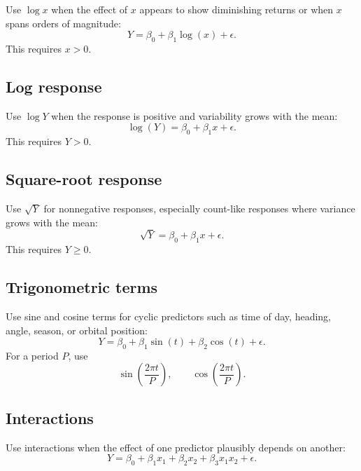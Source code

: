 Use \(\log x\) when the effect of \(x\) appears to show diminishing returns or when \(x\) spans orders of magnitude:
\begin{equation}
  Y=\beta_0+\beta_1\log(x)+\epsilon.
\end{equation}
This requires \(x>0\).

\subsection*{Log response}

Use \(\log Y\) when the response is positive and variability grows with the mean:
\begin{equation}
  \log(Y)=\beta_0+\beta_1x+\epsilon.
\end{equation}
This requires \(Y>0\).

\subsection*{Square-root response}

Use \(\sqrt{Y}\) for nonnegative responses, especially count-like responses where variance grows with the mean:
\begin{equation}
  \sqrt{Y}=\beta_0+\beta_1x+\epsilon.
\end{equation}
This requires \(Y\ge 0\).

\subsection*{Trigonometric terms}

Use sine and cosine terms for cyclic predictors such as time of day, heading, angle, season, or orbital position:
\begin{equation}
  Y=\beta_0+\beta_1\sin(t)+\beta_2\cos(t)+\epsilon.
\end{equation}
For a period \(P\), use
\begin{equation}
  \sin\left(\frac{2\pi t}{P}\right),
  \qquad
  \cos\left(\frac{2\pi t}{P}\right).
\end{equation}

\subsection*{Interactions}

Use interactions when the effect of one predictor plausibly depends on another:
\begin{equation}
  Y=\beta_0+\beta_1x_1+\beta_2x_2+\beta_3x_1x_2+\epsilon.
\end{equation}


